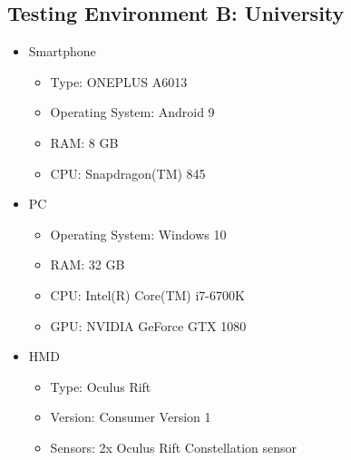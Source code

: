 \begin{appendices}
  \section{Testing Environment B: University}
  \begin{itemize}
    \item Smartphone
    \begin{itemize}
      \item Type: ONEPLUS A6013
      \item Operating System: Android 9
      \item RAM: 8 GB
      \item CPU: Snapdragon(TM) 845 %
    \end{itemize}
    \item \ac{PC}
    \begin{itemize} %
      \item Operating System: Windows 10
      \item RAM: 32 GB
      \item CPU: Intel(R) Core(TM) i7-6700K %
      \item GPU: NVIDIA GeForce GTX 1080  
    \end{itemize}
    \item \ac{HMD}
    \begin{itemize} %
      \item Type: Oculus Rift
      \item Version: Consumer Version 1
      \item Sensors: 2x Oculus Rift Constellation sensor
    \end{itemize}
  \end{itemize}

  
\end{appendices}
